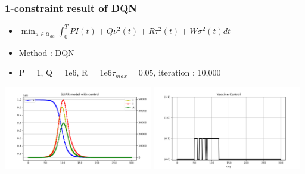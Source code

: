 \documentclass[usenames,dvipsnames, aspectratio=169, 9pt]{beamer}
\begin{document}
\begin{frame}\frametitle{1-constraint result of DQN}
\begin{itemize}
\item $ \min_{u\in\mathcal{U}_{ad}} \int_0^T PI(t) + Q\nu^2(t) + R\tau^2(t) + W\sigma^2(t) dt$
\item Method : DQN
\item P = 1, Q = 1e6, R = 1e6$\tau_{max} = 0.05$, iteration : 10,000
\end{itemize}
    \centering
    \includegraphics[width=6.5cm]{figure/sliar_dqn_tau.png}
    \includegraphics[width=6.5cm]{figure/sliar_dqn_tau_control.png}
\end{frame}
\end{document}

